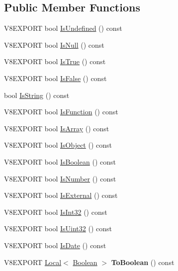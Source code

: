 \subsection*{Public Member Functions}
\begin{DoxyCompactItemize}
\item 
V8\+E\+X\+P\+O\+R\+T bool \hyperlink{classv8_1_1_value_adeeae3576aecadc4176f94a415a70a90}{Is\+Undefined} () const 
\item 
V8\+E\+X\+P\+O\+R\+T bool \hyperlink{classv8_1_1_value_a0757712320a9bcfe5fc0a099524d986f}{Is\+Null} () const 
\item 
V8\+E\+X\+P\+O\+R\+T bool \hyperlink{classv8_1_1_value_ae93277798682f4be9adc204a16c40591}{Is\+True} () const 
\item 
V8\+E\+X\+P\+O\+R\+T bool \hyperlink{classv8_1_1_value_a265c208159ff3163ecda1e9f71b99115}{Is\+False} () const 
\item 
bool \hyperlink{classv8_1_1_value_ab23a34b7df62806808e01b0908bf5f00}{Is\+String} () const 
\item 
V8\+E\+X\+P\+O\+R\+T bool \hyperlink{classv8_1_1_value_a33f329c93a9f417e2d05b438e6e5429c}{Is\+Function} () const 
\item 
V8\+E\+X\+P\+O\+R\+T bool \hyperlink{classv8_1_1_value_a95c39ad189c09630dd90ee5c1a7e89a1}{Is\+Array} () const 
\item 
V8\+E\+X\+P\+O\+R\+T bool \hyperlink{classv8_1_1_value_a360f1fe4a8ee74382f571a12eb14a222}{Is\+Object} () const 
\item 
V8\+E\+X\+P\+O\+R\+T bool \hyperlink{classv8_1_1_value_a6baff625780eac51413f2392250e81be}{Is\+Boolean} () const 
\item 
V8\+E\+X\+P\+O\+R\+T bool \hyperlink{classv8_1_1_value_a32003b217768f535a4728bbd16ebd7d5}{Is\+Number} () const 
\item 
V8\+E\+X\+P\+O\+R\+T bool \hyperlink{classv8_1_1_value_a7aed90ede9bf48b10f18cdb97d50fd1e}{Is\+External} () const 
\item 
V8\+E\+X\+P\+O\+R\+T bool \hyperlink{classv8_1_1_value_a70d4afaccc7903e6a01f40a46ad04188}{Is\+Int32} () const 
\item 
V8\+E\+X\+P\+O\+R\+T bool \hyperlink{classv8_1_1_value_a2674a47b2550eb456a7ecfaf09d2f97e}{Is\+Uint32} () const 
\item 
V8\+E\+X\+P\+O\+R\+T bool \hyperlink{classv8_1_1_value_abcdd87539238a68f8337bae7d0a9c1ac}{Is\+Date} () const 
\item 
\hypertarget{classv8_1_1_value_adb0df6e857c07ae754b032307d3b5dbe}{}V8\+E\+X\+P\+O\+R\+T \hyperlink{classv8_1_1_local}{Local}$<$ \hyperlink{classv8_1_1_boolean}{Boolean} $>$ {\bfseries To\+Boolean} () const \label{classv8_1_1_value_adb0df6e857c07ae754b032307d3b5dbe}


\end{DoxyCompactItemize}
